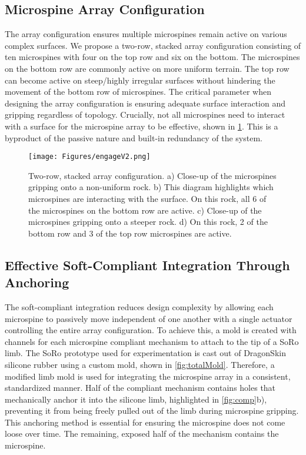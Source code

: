\subsection{Microspine Array Configuration}
The array configuration ensures multiple microspines remain active on various complex surfaces. We propose a two-row, stacked array configuration consisting of ten microspines with four on the top row and six on the bottom. The microspines on the bottom row are commonly active on more uniform terrain. The top row can become active on steep/highly irregular surfaces without hindering the movement of the bottom row of microspines. The critical parameter when designing the array configuration is ensuring adequate surface interaction and gripping regardless of topology. Crucially, not all microspines need to interact with a surface for the microspine array to be effective, shown in \Fig \ref{fig:eng}. This is a byproduct of the passive nature and built-in redundancy of the system.

\begin{figure}[h]
    \centering
    \texttt{[image: Figures/engageV2.png]}
    \caption{Two-row, stacked array configuration. a) Close-up of the microspines gripping onto a non-uniform rock. b) This diagram highlights which microspines are interacting with the surface. On this rock, all 6 of the microspines on the bottom row are active. c) Close-up of the microspines gripping onto a steeper rock. d) On this rock, 2 of the bottom row and 3 of the top row microspines are active.}
    \label{fig:eng}
\end{figure}


\subsection{Effective Soft-Compliant Integration Through Anchoring}
The soft-compliant integration reduces design complexity by allowing each microspine to passively move independent of one another with a single actuator controlling the entire array configuration. To achieve this, a mold is created with channels for each microspine compliant mechanism to attach to the tip of a SoRo limb. The SoRo prototype used for experimentation is cast out of DragonSkin\texttrademark~ silicone rubber using a custom mold, shown in \Fig \ref{fig:totalMold}. Therefore, a modified limb mold is used for integrating the microspine array in a consistent, standardized manner. Half of the compliant mechanism contains holes that mechanically anchor it into the silicone limb, highlighted in \Fig \ref{fig:comp}b), preventing it from being freely pulled out of the limb during microspine gripping. This anchoring method is essential for ensuring the microspine does not come loose over time. The remaining, exposed half of the mechanism contains the microspine.

